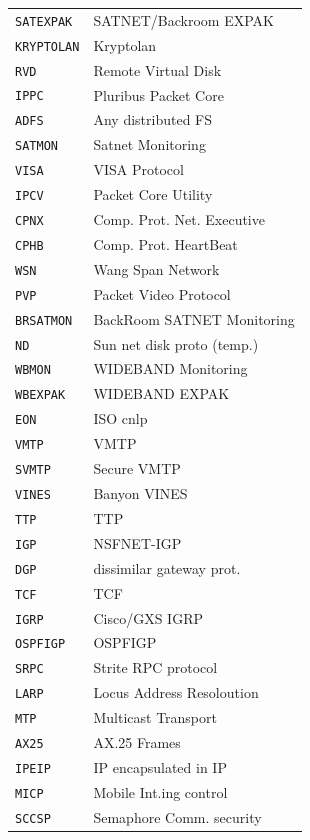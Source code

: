 \documentclass[10pt,a4paper,openany]{mudbook}
\begin{document}
\begin{longtable}{l|p{}}
  \texttt{SATEXPAK} & SATNET/Backroom EXPAK \\
  \texttt{KRYPTOLAN} & Kryptolan \\
  \texttt{RVD} & Remote Virtual Disk \\
  \texttt{IPPC} & Pluribus Packet Core \\
  \texttt{ADFS} & Any distributed FS \\
  \texttt{SATMON} & Satnet Monitoring \\
  \texttt{VISA} & VISA Protocol \\
  \texttt{IPCV} & Packet Core Utility \\
  \texttt{CPNX} & Comp. Prot. Net. Executive \\
  \texttt{CPHB} & Comp. Prot. HeartBeat \\
  \texttt{WSN} & Wang Span Network \\
  \texttt{PVP} & Packet Video Protocol \\
  \texttt{BRSATMON} & BackRoom SATNET Monitoring \\
  \texttt{ND} & Sun net disk proto (temp.) \\
  \texttt{WBMON} & WIDEBAND Monitoring \\
  \texttt{WBEXPAK} & WIDEBAND EXPAK \\
  \texttt{EON} & ISO cnlp \\
  \texttt{VMTP} & VMTP \\
  \texttt{SVMTP} & Secure VMTP \\
  \texttt{VINES} & Banyon VINES \\
  \texttt{TTP} & TTP \\
  \texttt{IGP} & NSFNET-IGP \\
  \texttt{DGP} & dissimilar gateway prot. \\
  \texttt{TCF} & TCF \\
  \texttt{IGRP} & Cisco/GXS IGRP \\
  \texttt{OSPFIGP} & OSPFIGP \\
  \texttt{SRPC} & Strite RPC protocol \\
  \texttt{LARP} & Locus Address Resoloution \\
  \texttt{MTP} & Multicast Transport \\
  \texttt{AX25} & AX.25 Frames \\
  \texttt{IPEIP} & IP encapsulated in IP \\
  \texttt{MICP} & Mobile Int.ing control \\
  \texttt{SCCSP} & Semaphore Comm. security \\

\end{longtable}
\end{document}
